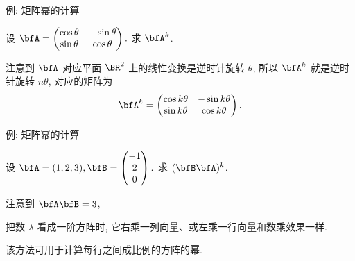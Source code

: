 \begin{frame}{例: 矩阵幂的计算}
	\onslide<+->
	\begin{example}
		设
		$\bfA=\begin{pmatrix}
			\cos\theta&-\sin\theta\\
			\sin\theta&\cos\theta
		\end{pmatrix}.$
		求 $\bfA^k$.
	\end{example}
	\onslide<+->
	\begin{solution}
		注意到 $\bfA$ 对应平面 $\BR^2$ 上的线性变换是逆时针旋转 $\theta$, 所以 $\bfA^k$ 就是逆时针旋转 $n\theta$, 对应的矩阵为
		\[\bfA^k=\begin{pmatrix}
			\cos k\theta&-\sin k\theta\\
			\sin k\theta&\cos k\theta
		\end{pmatrix}.\]
	\end{solution}
\end{frame}


\begin{frame}{例: 矩阵幂的计算}
	\onslide<+->
	\begin{example}
		设 
		$\bfA=(1,2,3),\bfB=\begin{pmatrix}
			-1\\2\\0
		\end{pmatrix}.$
		求 $(\bfB\bfA)^k$.
	\end{example}
	\onslide<+->
	\begin{solution}
		注意到 $\bfA\bfB=3$,
		\vspace{-\baselineskip}
	\end{solution}
	\onslide<+->
	把数 $\lambda$ 看成一阶方阵时, 它右乘一列向量、或左乘一行向量和数乘效果一样.

	\onslide<+->
	该方法可用于计算每行之间成比例的方阵的幂.
\end{frame}


